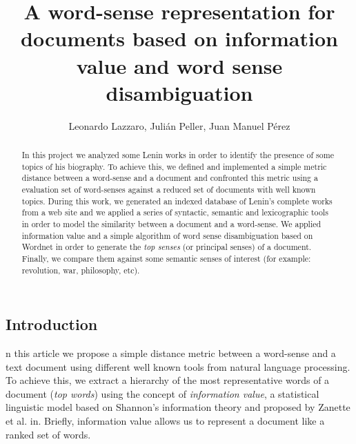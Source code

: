 \documentclass{pnastwo}
\begin{document}
\title{A word-sense representation for documents based on information value and word sense disambiguation}

\author{Leonardo Lazzaro,
Julián Peller,
Juan Manuel Pérez
}


\maketitle

\begin{article}
\begin{abstract}
In this project we analyzed some Lenin works in order to identify the presence of some topics of his biography. To achieve this, we defined and implemented a simple metric distance between a word-sense and a document and confronted this metric using a evaluation set of word-senses against a reduced set of  documents with well known topics. During this work, we generated an indexed database of Lenin's complete works from a web site\cite{LENIN} and we applied a series of syntactic, semantic and lexicographic tools in order to model the similarity between a document and a word-sense. We applied information value\cite{DARWIN} and a simple algorithm of word sense disambiguation\cite{LESK} based on Wordnet\cite{WORDNET} in order to generate the \emph{top senses} (or principal senses) of a document. Finally, we compare them against some semantic senses of interest (for example: revolution, war, philosophy, etc). 
\end{abstract}



\section{Introduction}

n this article we propose a simple distance metric between a word-sense and a text document using different well known tools from natural language processing. To achieve this, we extract a hierarchy of the most representative words of a document (\textit{top words}) using the concept of \textit{information value}, a statistical linguistic model based on Shannon's information theory and proposed by Zanette et al. in\cite{DARWIN}. Briefly, information value allows us to represent a document like a ranked set of words. 


\end{article}
\end{document}
